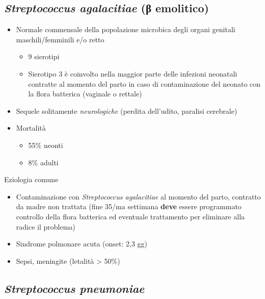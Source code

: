 \documentclass[italian,]{article}
\providecommand{\tightlist}{%
  \setlength{\itemsep}{0pt}\setlength{\parskip}{0pt}}
\newcommand{\normalbox}[2]{\begin{tcolorbox}[title=#1]#2\end{tcolorbox}} %
\begin{document}
\hypertarget{streptococcus-agalacitiae-ux3b2-emolitico}{%
\subsection{\texorpdfstring{\emph{Streptococcus agalacitiae} (β
emolitico)}{Streptococcus agalacitiae (β emolitico)}}\label{streptococcus-agalacitiae-ux3b2-emolitico}}

\begin{itemize}
\tightlist
\item
  Normale commensale della popolazione microbica degli organi genitali
  maschili/femminili e/o retto

  \begin{itemize}
  \tightlist
  \item
    9 sierotipi
  \item
    Sierotipo 3 è coinvolto nella maggior parte delle infezioni
    neonatali contratte al momento del parto in caso di contaminazione
    del neonato con la flora batterica (vaginale o rettale)
  \end{itemize}
\item
  Sequele solitamente \emph{neurologiche} (perdita dell'udito, paralisi
  cerebrale)
\item
  Mortalità

  \begin{itemize}
  \tightlist
  \item
    55\% neonti
  \item
    8\% adulti
  \end{itemize}
\end{itemize}

\normalbox{Infezioni neonatali}{
Eziologia comune

\begin{itemize}
\tightlist
\item
  Contaminazione con \emph{Streptococcus agalacitiae} al momento del
  parto, contratto da madre non trattata (fine 35/ma settimana
  \textbf{deve} essere programmato controllo della flora batterica ed
  eventuale trattamento per eliminare alla radice il problema)
\item
  Sindrome polmonare acuta (onset: 2,3 gg)
\item
  Sepsi, meningite (letalità \textgreater{} 50\%)
\end{itemize}
}

\hypertarget{streptococcus-pneumoniae}{%
\subsection{\texorpdfstring{\emph{Streptococcus
pneumoniae}}{Streptococcus pneumoniae}}\label{streptococcus-pneumoniae}}
\end{document}
